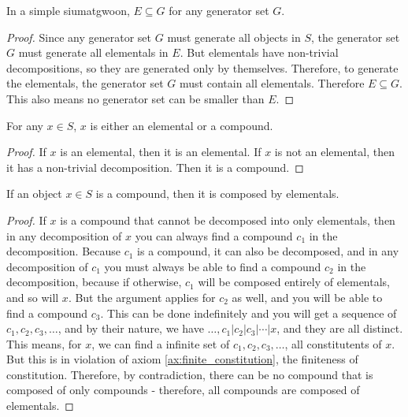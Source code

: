 \begin{lemma}\label{lem:elementals-are-in-every-generator-set}
    In a simple siumatgwoon, $E\subseteq G$ for any generator set $G$.
\end{lemma}
\begin{proof}
    Since any generator set $G$ must generate all objects in $S$, the generator set $G$ must generate all elementals in $E$. But elementals have non-trivial decompositions, so they are generated only by themselves. Therefore, to generate the elementals, the generator set $G$ must contain all elementals. Therefore $E\subseteq G$. This also means no generator set can be smaller than $E$.
\end{proof}

\begin{lemma}\label{lem:elementals-are-not-compounds}
    For any $x\in S$, $x$ is either an elemental or a compound.
\end{lemma}
\begin{proof}
    If $x$ is an elemental, then it is an elemental. If $x$ is not an elemental, then it has a non-trivial decomposition. Then it is a compound.
\end{proof}



\begin{lemma}\label{lem:compounds-are-composed-by-elementals}
    If an object $x\in S$ is a compound, then it is composed by elementals.
\end{lemma}
\begin{proof}

    If $x$ is a compound that cannot be decomposed into only elementals, then in any decomposition of $x$ you can always find a compound $c_1$ in the decomposition. Because $c_1$ is a compound, it can also be decomposed, and in any decomposition of $c_1$ you must always be able to find a compound $c_2$ in the decomposition, because if otherwise, $c_1$ will be composed entirely of elementals, and so will $x$. But the argument applies for $c_2$ as well, and you will be able to find a compound $c_3$. This can be done indefinitely and you will get a sequence of $c_1, c_2, c_3, \ldots$, and by their nature, we have  $\ldots, c_1|c_2|c_3|\cdots|x$, and they are all distinct. This means, for $x$, we can find a infinite set of $c_1, c_2, c_3, \ldots$, all constitutents of $x$. But this is in violation of axiom \ref{ax:finite_constitution}, the finiteness of constitution. Therefore, by contradiction, there can be no compound that is composed of only compounds - therefore, all compounds are composed of elementals.
\end{proof}


